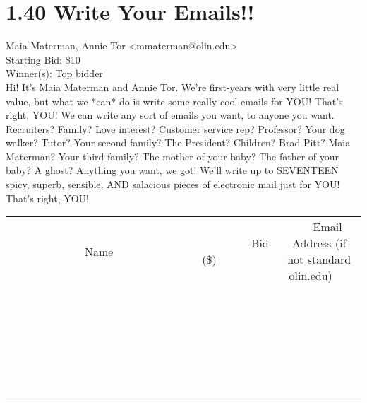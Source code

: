 \documentclass[11pt]{article}
\begin{document}
					\section*{1.40 Write Your Emails!!}
					Maia Materman, Annie Tor <mmaterman@olin.edu> \\
					Starting Bid: \$10 \\
					Winner(s): Top bidder \\
					Hi! It's Maia Materman and Annie Tor. We're first-years with very little real value, but what we *can* do is write some really cool emails for YOU! That's right, YOU! We can write any sort of emails you want, to anyone you want. Recruiters? Family? Love interest? Customer service rep? Professor? Your dog walker? Tutor? Your second family? The President? Children? Brad Pitt? Maia Materman? Your third family? The mother of your baby? The father of your baby? A ghost? Anything you want, we got! We'll write up to SEVENTEEN spicy, superb, sensible, AND salacious pieces of electronic mail just for YOU! That's right, YOU! \\
					[6ex]
					\begin{tabular}{c c c}
						~~~~~~~~~~~~~Name~~~~~~~~~~~~~ & ~~~~~~~~~Bid (\$)~~~~~~~~~ & ~~~Email Address (if not standard olin.edu)~~~ \\
				
 & & \\
\hline
 & & \\
\hline
 & & \\
\hline
 & & \\
\hline
 & & \\
\hline
 & & \\
\hline
 & & \\
\hline
 & & \\
\hline
 & & \\
\hline
 & & \\
\hline
 & & \\
\hline
 & & \\
\hline
 & & \\
\hline
 & & \\
\hline
 & & \\
\hline
 & & \\
\hline
 & & \\
\hline
 & & \\
\hline
 & & \\
\hline
 & & \\
\hline
 & & \\
\hline
 & & \\
\hline
 & & \\
\hline
 & & \\
\hline
 & & \\
\hline
 & & \\
\hline
					\end{tabular}
					\clearpage
				
\end{document}
